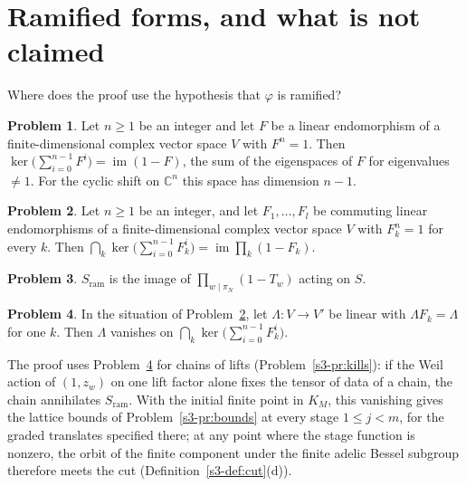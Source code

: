 \documentclass[reqno]{amsart}
\theoremstyle{definition}
\newtheorem{problem}{Problem}[section]
\theoremstyle{plain}
\newcommand{\C}{\mathbb{C}}
\newcommand{\ram}{\mathrm{ram}}
\begin{document}
\section{Ramified forms, and what is not claimed}\label{sec:claim}

Where does the proof use the hypothesis that \(\varphi\) is ramified?

\begin{problem}\label{pr:mean}
Let \(n \ge 1\) be an integer and let \(F\) be a linear endomorphism of a finite-dimensional complex vector space \(V\) with \(F^n = 1\).  Then \(\ker\bigl(\sum_{i=0}^{n-1} F^i\bigr) = \operatorname{im}(1 - F)\), the sum of the eigenspaces of \(F\) for eigenvalues \(\ne 1\).  For the cyclic shift on \(\C^n\) this space has dimension \(n - 1\).
\end{problem}

\begin{problem}\label{pr:mean-several}
Let \(n \ge 1\) be an integer, and let \(F_1, \dots, F_l\) be commuting linear endomorphisms of a finite-dimensional complex vector space \(V\) with \(F_k^n = 1\) for every \(k\).  Then \(\bigcap_k \ker\bigl(\sum_{i=0}^{n-1} F_k^i\bigr) = \operatorname{im}\prod_k (1 - F_k)\).
\end{problem}

\begin{problem}\label{pr:ram-image}
\(S_{\ram}\) is the image of \(\prod_{w \mid \pi_N}(1 - T_w)\) acting on \(S\).
\end{problem}

\begin{problem}\label{pr:fixed}
In the situation of Problem~\ref{pr:mean-several}, let \(\Lambda \colon V \to V'\) be linear with \(\Lambda F_k = \Lambda\) for one \(k\).  Then \(\Lambda\) vanishes on \(\bigcap_k \ker\bigl(\sum_{i=0}^{n-1} F_k^i\bigr)\).
\end{problem}

The proof uses Problem~\ref{pr:fixed} for chains of lifts (Problem~\ref{s3-pr:kills}): if the Weil action of \((1, z_w)\) on one lift factor alone fixes the tensor of data of a chain, the chain annihilates \(S_{\ram}\).  With the initial finite point in \(K_M\), this vanishing gives the lattice bounds of Problem~\ref{s3-pr:bounds} at every stage \(1\le j<m\), for the graded translates specified there; at any point where the stage function is nonzero, the orbit of the finite component under the finite adelic Bessel subgroup therefore meets the cut (Definition~\ref{s3-def:cut}(d)).
\end{document}
